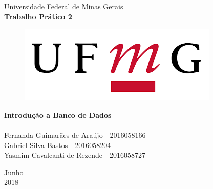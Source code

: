 \documentclass{article}
\begin{document}

\begin{titlepage}
  \begin{center}
    
    \Huge{Universidade Federal de Minas Gerais}\\     
    \vspace{15pt}
    \vspace{95pt}
    \textbf{\LARGE{Trabalho Prático 2}}\\
    \vspace{3,5cm}
    \begin{figure}[h]
      \begin{center}
        \includegraphics[scale = 0.50]{ufmg.png}
      \end{center}
     \label{fig:graph}
    \end{figure}
        
  \end{center}
  
  \begin{flushleft}
    \begin{tabbing}
      \textbf {Introdução a Banco de Dados}\\
      \\
        Fernanda Guimarães de Araújo - 2016058166\\
        Gabriel Silva Bastos - 2016058204\\
        Yasmim Cavalcanti de Rezende - 2016058727
      \end{tabbing}
  \end{flushleft}
  
    \vspace{1cm} 
  \begin{center}
    \vspace{\fill}
    Junho\\
    2018
  \end{center}
\end{titlepage}
\end{document}

